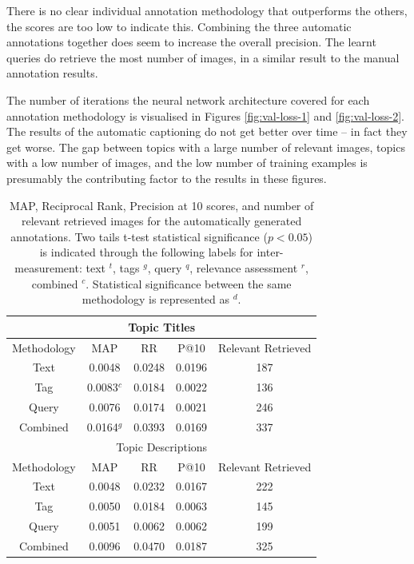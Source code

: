There is no clear individual annotation methodology that outperforms the others, the scores are too low to indicate this. Combining the three automatic annotations together does seem to increase the overall precision. The learnt queries do retrieve the most number of images, in a similar result to the manual annotation results.

The number of iterations the neural network architecture covered for each annotation methodology is visualised in Figures \ref{fig:val-loss-1} and \ref{fig:val-loss-2}. The results of the automatic captioning do not get better over time -- in fact they get worse. The gap between topics with a large number of relevant images, topics with a low number of images, and the low number of training examples is presumably the contributing factor to the results in these figures.

\begin{table}[ht]
    \centering
    \begin{tabular}{|c|c|c|c|c|}
        \multicolumn{5}{c}{Topic Titles}\\ \hline
         Methodology & MAP & RR & P@10 & Relevant Retrieved\\ \hline
         Text & 0.0048 & 0.0248 & 0.0196 & 187 \\ \hline
         Tag & 0.0083$^{c}$ & 0.0184 & 0.0022 & 136 \\ \hline
         Query & 0.0076 & 0.0174 & 0.0021 & 246 \\ \hline
         Combined & 0.0164$^{g}$ & 0.0393 & 0.0169 & 337 \\ \hline
        \multicolumn{5}{c}{Topic Descriptions}\\ \hline
         Methodology & MAP & RR & P@10 & Relevant Retrieved\\ \hline
         Text & 0.0048 & 0.0232 & 0.0167 & 222 \\ \hline
         Tag & 0.0050 & 0.0184 & 0.0063 & 145 \\ \hline
         Query & 0.0051 & 0.0062 & 0.0062 & 199 \\ \hline
         Combined & 0.0096 & 0.0470 & 0.0187 & 325 \\ \hline
    \end{tabular}
    \caption{MAP, Reciprocal Rank, Precision at 10 scores, and number of relevant retrieved images for the automatically generated annotations. Two tails t-test statistical significance ($p<0.05$) is indicated through the following labels for inter-measurement: text $^t$, tags $^g$, query $^q$, relevance assessment $^r$, combined $^c$. Statistical significance between the same methodology is represented as $^d$.}
    \label{table:learnt-results}
\end{table}


